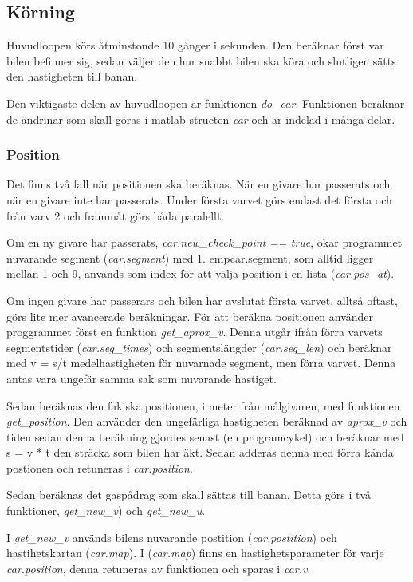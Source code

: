 \documentclass[10pt,oneside,swedish]{lips-no_customer}
\begin{document}
\subsection{Körning}

Huvudloopen körs åtminstonde 10 gånger i sekunden. Den beräknar först var bilen
befinner sig, sedan väljer den hur snabbt bilen ska köra och slutligen sätts den
hastigheten till banan.

Den viktigaste delen av huvudloopen är funktionen \emph{do\_car}. Funktionen
beräknar de ändrinar som skall göras i matlab-structen \emph{car} och är indelad
i många delar.

\subsubsection{Position}

Det finns två fall när positionen ska beräknas. När en givare har passerats och
när en givare inte har passerats. Under första varvet görs endast det första och
från varv 2 och frammåt görs båda paralellt. 

Om en ny givare har passerats, \emph{car.new\_check\_point == true}, ökar
programmet nuvarande segment (\emph{car.segment}) med 1. emp{car.segment}, som
alltid ligger mellan 1 och 9, används som index för att välja position i en
lista (\emph{car.pos\_at}). 

Om ingen givare har passerars och bilen har avslutat första varvet, alltså
oftast, görs lite mer avancerade beräkningar. För att beräkna positionen
använder proggrammet först en funktion \emph{get\_aprox\_v}. Denna utgår ifrån
förra varvets segmentstider (\emph{car.seg\_times}) och segmentslängder
(\emph{car.seg\_len}) och beräknar med v = s/t medelhastigheten för nuvarnade
segment, men förra varvet. Denna antas vara ungefär samma sak som nuvarande
hastiget. 

Sedan beräknas den fakiska positionen, i meter från målgivaren, med funktionen
\emph{get\_position}. Den använder den ungefärliga hastigheten beräknad av
\emph{aprox\_v} och tiden sedan denna beräkning gjordes senast (en programcykel)
och beräknar med s = v * t den sträcka som bilen har äkt. Sedan adderas denna
med förra kända postionen och retuneras i \emph{car.position}. 

Sedan beräknas det gaspådrag som skall sättas till banan. Detta görs i två
funktioner, \emph{get\_new\_v}) och \emph{get\_new\_u}.
 
I \emph{get\_new\_v} används bilens nuvarande postition (\emph{car.postition})
och hastihetskartan (\emph{car.map}). I (\emph{car.map}) finns en
hastighetsparameter för varje \emph{car.position}, denna retuneras av funktionen
och sparas i \emph{car.v}.
 
\end{document}
